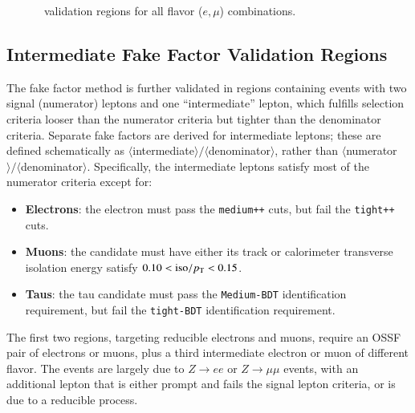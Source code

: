 \begin{figure}[tbp]
  \hfill
  \caption{\ttbar\ validation regions for all flavor ($e, \mu$) combinations.}
  \label{fig:model-independent-VR-ttbar}
\end{figure}

\subsection{Intermediate Fake Factor Validation Regions}\label{sec:model-independent-validation-regions-intermediate-ff}
The fake factor method is further validated in regions containing events with two signal (numerator) leptons and one ``intermediate'' lepton, which fulfills selection criteria looser than the numerator criteria but tighter than the denominator criteria. Separate fake factors are derived for intermediate leptons; these are defined schematically as $\langle$intermediate$\rangle/\langle$denominator$\rangle$, rather than $\langle$numerator$\rangle/\langle$denominator$\rangle$. Specifically, the intermediate leptons satisfy most of the numerator criteria except for:

\begin{itemize}
	\item \textbf{Electrons}: the electron must pass the \texttt{medium++} cuts, but fail the \texttt{tight++} cuts.  
	\item \textbf{Muons}: the candidate must have either its track or calorimeter transverse isolation energy
	satisfy $0.10 < \mathrm{iso}/p_{\text{T}} < 0.15$.
	\item \textbf{Taus}: the tau candidate must pass the \texttt{Medium-BDT} identification requirement, but fail the
	\texttt{tight-BDT} identification requirement.
\end{itemize}

The first two regions, targeting reducible electrons and muons, require an OSSF pair of electrons or muons, plus a third intermediate electron or muon of different flavor. The events are largely due to $Z\rightarrow ee$ or $Z\rightarrow \mu\mu$ events, with an additional lepton that is either prompt and fails the signal lepton criteria, or is due to a reducible process. 

